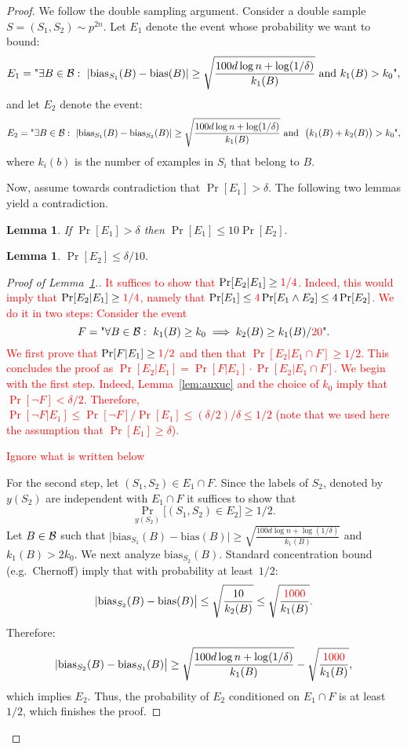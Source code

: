 \documentclass{article}
\newtheorem{lemma}[theorem]{Lemma}
\newcommand{\B}{{\cal B}}
\newcommand{\bias}{\text{bias}}
\newcommand{\samp}{S}
\newcommand{\new}[1]{\textcolor{red}{#1}}
\begin{document}
\begin{proof}
We follow the double sampling argument.
Consider a double sample $S=(\samp_1,\samp_2)\sim p^{2n}$.
Let $E_1$ denote the event whose probability we want to bound:
\[
E_1 = \text{"}\exists {B\in\B}:~\lvert \bias_{\samp_1}(B) -
\bias(B)\rvert \geq \sqrt{\frac{100d\log n + \log(1/\delta)}{k_1(B)}}
\mbox{ and } k_1(B)>k_0
\text{"}, 
\]
and let $E_2$ denote the event:
\[
E_2 = \text{"}\exists {B\in\B}:~\lvert \bias_{\samp_1}(B) -  \bias_{\samp_2}(B)\rvert \geq \sqrt{\frac{100d\log n + \log(1/\delta)}{k_1(B)}}
  \mbox{ and }~ \bigl(k_1(B) + k_2(B)\bigr)>k_0
  \text{"},
\]
where $k_i(b)$ is the number of examples in $S_i$ that belong to $B$.

Now, assume towards contradiction that $\Pr[E_1] > \delta$.
The following two lemmas yield a contradiction.
\begin{lemma}\label{lem:aux1}
If $\Pr[E_1] > \delta$ then $\Pr[E_1]\leq 10\Pr[E_2].$
\end{lemma}
\begin{lemma}\label{lem:aux2}
$\Pr[E_2]\leq \delta/10.$
\end{lemma}

\begin{proof}[Proof of Lemma~\ref{lem:aux1}.]

\new{It suffices to show that $\Pr[E_2 \vert E_1]\geq \new{1/4}$.
Indeed, this would imply that $\Pr[E_2 \vert E_1]\geq \new{1/4}$, 
namely that $\Pr[E_1] \leq \new{4}\Pr[E_1 \land E_2]\leq 4\Pr[E_2]$.
We do it in two steps:
Consider the event
\[
F = \text{"}\forall {B\in\B}:~k_1(B) \geq k_0 \implies k_2(B) \geq k_1(B)/\new{20}
  \text{"}.
\]
We first prove that $\Pr[F \vert E_1] \geq \new{1/2}$ and then that $\Pr[E_2 \vert E_1\cap F]\geq 1/2$.
This concludes the proof as $\Pr[E_2 \vert E_1] = \Pr[F \vert E_1]\cdot\Pr[E_2 \vert E_1\cap F]$.}
\new{
We begin with the first step.
Indeed, Lemma~\ref{lem:auxuc} and the choice of $k_0$ 
imply that $\Pr[\lnot F] < \delta/2$.
Therefore, $\Pr[\lnot F \vert E_1] \leq \Pr[\lnot F]/\Pr[E_1] \leq (\delta/2)/\delta\leq 1/2$
(note that we used here the assumption that $\Pr[E_1]\geq \delta$).}

\new{Ignore what is written below}

For the second step,
let $(S_1,S_2)\in E_1\cap F$. 
Since the labels of $S_2$, denoted by $y(S_2)$ are independent with $E_1\cap F$
it suffices to show that 
\[\Pr_{y(S_2)}\bigl[(S_1,S_2)\in E_2 \bigr] \geq 1/2.\]
Let $B\in\B$ such that $\lvert \bias_{\samp_1}(B) -  \bias(B)\rvert \geq \sqrt{\frac{100d\log n + \log(1/\delta)}{k_1(B)} }$
and $k_1(B) > 2k_0$. 
We next analyze $\bias_{\samp_2}(B)$.
Standard concentration bound (e.g.\ Chernoff)
imply that with probability at least~$1/2$:
\[\lvert \bias_{\samp_2}(B) -  \bias(B)\bigr\rvert \leq \sqrt{\frac{10}{k_2(B)}} \leq \sqrt{\frac{\new{1000}}{k_1(B)}}.\]
Therefore:
\[\lvert \bias_{\samp_2}(B) -  \bias_{\samp_1}(B)\bigr\rvert \geq \sqrt{\frac{100d\log n + \log(1/\delta)}{k_1(B)} }- \sqrt{\frac{\new{1000}}{k_1(B)}},\]
which implies $E_2$.
Thus, the probability of $E_2$ conditioned on $E_1\cap F$
is at least $1/2$, which finishes the proof.


\end{proof}
\end{proof}
\end{document}
